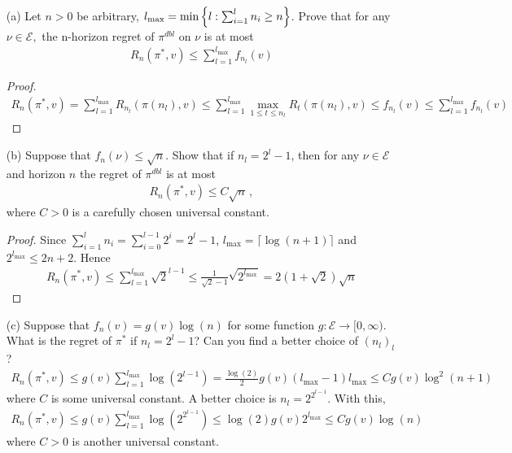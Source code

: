 \begin{enumerate}
    \item[(a)]  Let $n > 0$ be arbitrary, $l_{\max} = \min\left\{ l :\sum_{i=1}^l n_i \geq n \right\}$. Prove that for any $\nu \in\mathcal{E},$ the n-horizon regret of $\pi^{dbl}$ on $\nu$ is at most
    \begin{align*}
        R_n(\pi^*,v)\leq \sum_{l=1}^{l_{\max}}f_{n_l}(v)
    \end{align*}
    \begin{proof}
    \begin{align*}
        R_n(\pi^*,v) = \sum_{l=1}^{l_{\max}} R_{n_l}(\pi(n_l),v) \leq \sum_{l=1}^{l_{\max}} \max_{1\leq t\leq n_l} R_t(\pi(n_l),v)\leq f_{n_l}(v) \leq \sum_{l=1}^{l_{\max}}f_{n_l}(v)
    \end{align*}
    \end{proof}
    \item[(b)] Suppose that $f_n(\nu) \le \sqrt{n}$. Show that if $n_l = 2^l -1$, then for any $\nu \in \mathcal{E}$ and horizon $n$ the regret of $\pi^{dbl}$ is at most
    \begin{align*}
        R_n(\pi^*,v)\leq C\sqrt{n} \, ,
    \end{align*}
    where $C > 0$ is a carefully chosen universal constant.
    \begin{proof}
        Since $\sum_{i=1}^{l}n_i = \sum_{i=0}^{l-1}2^i = 2^l-1$, $l_{\max} = \lceil \log(n+1)\rceil$ and $2^{l_{\max}}\leq 2n+2$. Hence
        \begin{align*}
            R_n(\pi^*,v) \leq \sum_{l=1}^{l_{\max}} \sqrt{2}^{l-1}\leq \frac{1}{\sqrt{2}-1} \sqrt{2^{l_{\max}}} = 2(1+\sqrt{2})\sqrt{n}
        \end{align*}
    \end{proof}
    \item[(c)] Suppose that $f_n(v) = g(v) \log(n)$ for some function $g : \mathcal{E} \to [0, \infty)$. What is the regret of $\pi^*$ if $n_l = 2^l -1$? Can you find a better choice of $(n_l)_l$ ?
    \begin{align*}
        R_n(\pi^*,v)\leq g(v)\sum_{l=1}^{l_{\max}}\log(2^{l-1})
        =\frac{\log(2)}{2}g(v)(l_{\max}-1)l_{\max}\leq C g(v)\log^2(n+1)
    \end{align*}
    where $C$ is some universal constant. A better choice is $n_l = 2^{2^{l-1}}$. With this,
    \begin{align*}
        R_n(\pi^*,v)\leq g(v)\sum_{l=1}^{l_{\max}} \log(2^{2^{l-1}})\leq \log(2)g(v)2^{l_{\max}}\leq Cg(v)\log(n)
    \end{align*}
    where $C>0$ is another universal constant.
\end{enumerate}

